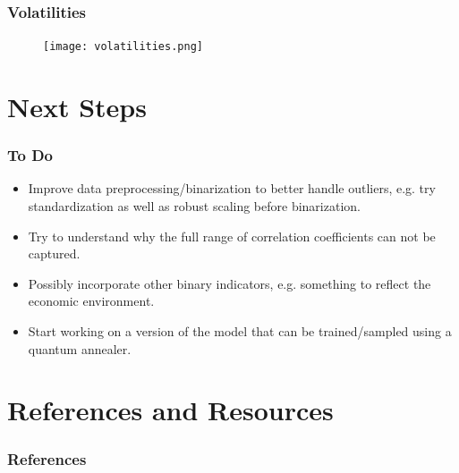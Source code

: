 \documentclass{beamer}
\begin{document}
\begin{frame}
    \frametitle{Volatilities}
    \begin{figure}
        \texttt{[image: volatilities.png]}
        \label{volatilities}
    \end{figure}
\end{frame}


\section{Next Steps}

\begin{frame}
    \frametitle{To Do}
    \begin{itemize}
        \item Improve data preprocessing/binarization to better handle outliers, e.g. try standardization as well as robust scaling before binarization.
        \item Try to understand why the full range of correlation coefficients can not be captured.
        \item Possibly incorporate other binary indicators, e.g. something to reflect the economic environment.
        \item Start working on a version of the model that can be trained/sampled using a quantum annealer.
    \end{itemize}
\end{frame}


\section{References and Resources}

\begin{frame}[allowframebreaks]
    \frametitle{References}
    \footnotesize{
        
        
    }
\end{frame}
\end{document}
